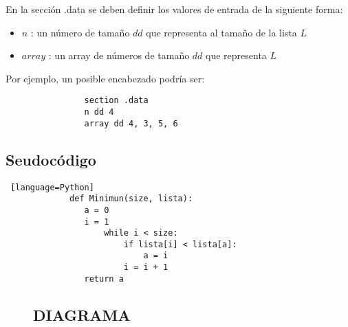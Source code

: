 \documentclass[a4paper]{article}
\begin{document}
\begin{flushleft}
      		En la sección .data se deben definir los valores de entrada de la siguiente forma:
      		
      		\begin{itemize}
      			
      			\item $n$ : un número de tamaño $dd$ que representa al tamaño de la lista $L$
      			
      			\item $array$ : un array de números de tamaño $dd$ que representa $L$
      			
      			
      		\end{itemize}
      	
      		Por ejemplo, un posible encabezado podría ser:
      		
      		\begin{lstlisting}
      			section .data
      			n dd 4
      			array dd 4, 3, 5, 6
      		\end{lstlisting}
      		
      		
      		\subsection*{Seudocódigo}
      		
      	      \begin{lstlisting} [language=Python]
      	     def Minimun(size, lista):
      	     	a = 0
      	     	i = 1
      	     		while i < size:
      	     			if lista[i] < lista[a]:
      	     				a = i
      	     			i = i + 1
      	     	return a 
      	     \end{lstlisting}
      		 
      		 \begin{figure}[ht]
      		 	\centering
      		 	\subsection*{DIAGRAMA}
\end{figure}
\end{flushleft}
\end{document}
